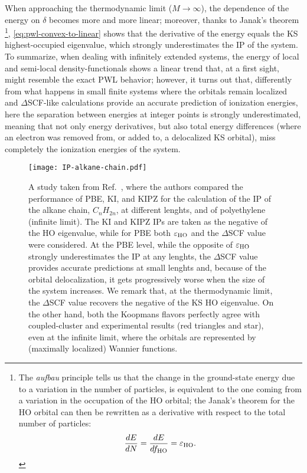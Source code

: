 %
When approaching the thermodynamic limit ($M\longrightarrow \infty$), the dependence of the energy on $\delta$ becomes more and more linear; moreover, thanks to Janak's theorem
\footnote{The \emph{aufbau} principle tells us that the change in the ground-state energy due to a variation in the number of particles, is equivalent to the one coming from a variation in the occupation of the HO orbital; the Janak's theorem for the HO orbital can then be rewritten as a derivative with respect to the total number of particles:
\begin{equation*}
    \frac{dE}{dN} = \frac{dE}{df_{\rm HO}} = \varepsilon_{\rm HO} .
\end{equation*}
}, 
\cref{eq:pwl-convex-to-linear} shows that the derivative of the energy equals the KS highest-occupied eigenvalue, which strongly underestimates the IP of the system. To summarize, when dealing with infinitely extended systems, the energy of local and semi-local density-functionals shows a linear trend that, at a first sight, might resemble the exact PWL behavior; however, it turns out that, differently from what happens in small finite systems where the orbitals remain localized and $\Delta$SCF-like calculations provide an accurate prediction of ionization energies, here the separation between energies at integer points is strongly underestimated, meaning that not only energy derivatives, but also total energy differences (where an electron was removed from, or added to, a delocalized KS orbital), miss completely the ionization energies of the system.

\begin{figure}
    \centering
    \texttt{[image: IP-alkane-chain.pdf]}
    \caption[PBE, KI, and KIPZ IPs for the alkane chain.]{A study taken from Ref.~\cite{nguyen_koopmans-compliant_2018}, where the authors compared the performance of PBE, KI, and KIPZ for the calculation of the IP of the alkane chain, $C_n H_{2n}$, at different lenghts, and of polyethylene (infinite limit). The KI and KIPZ IPs are taken as the negative of the HO eigenvalue, while for PBE both $\varepsilon_{\rm HO}$ and the $\Delta$SCF value were considered. At the PBE level, while the opposite of $\varepsilon_{\rm HO}$ strongly underestimates the IP at any lenghts, the $\Delta$SCF value provides accurate predictions at small lenghts and, because of the orbital delocalization, it gets progressively worse when the size of the system increases. We remark that, at the thermodynamic limit, the $\Delta$SCF value recovers the negative of the KS HO eigenvalue. On the other hand, both the Koopmans flavors perfectly agree with coupled-cluster and experimental results (red triangles and star), even at the infinite limit, where the orbitals are represented by (maximally localized) Wannier functions.}
    \label{fig:ip-alkane-chain}
\end{figure}

